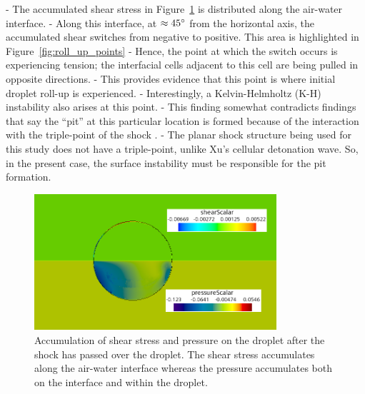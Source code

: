 \documentclass{UCF_ETD}
\begin{document}
- The accumulated shear stress in Figure~\ref{fig:shear_pressure_accumulation} is distributed along the air-water interface.
- Along this interface, at $\approx 45 \degree$ from the horizontal axis, the accumulated shear switches from negative to positive. This area is highlighted in Figure~\ref{fig:roll_up_points}
- Hence, the point at which the switch occurs is experiencing tension; the interfacial cells adjacent to this cell are being pulled in opposite directions.
- This provides evidence that this point is where initial droplet roll-up is experienced.
- Interestingly, a Kelvin-Helmholtz (K-H) instability also arises at this point.
- This finding somewhat contradicts findings that say the ``pit''  at this particular location is formed because of the interaction with the triple-point of the shock \cite{Xu2024}.
- The planar shock structure being used for this study does not have a triple-point, unlike Xu's cellular detonation wave. So, in the present case, the surface instability must be responsible for the pit formation.


\begin{figure}
    \centering
    \includegraphics[width=0.8\textwidth]{Figures/pressure_and_shear_accumulation.png}
    \caption{Accumulation of shear stress and pressure on the droplet after the shock has passed over the droplet. The shear stress accumulates along the air-water interface whereas the pressure accumulates both on the interface and within the droplet.}
    \label{fig:shear_pressure_accumulation}
\end{figure}
\end{document}
